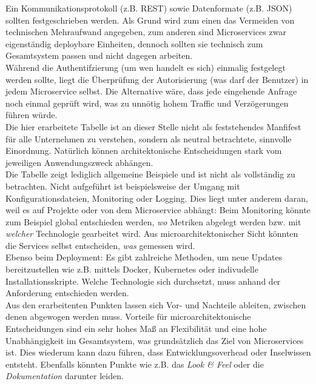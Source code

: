 Ein Kommunikationsprotokoll (z.B. REST) sowie Datenformate (z.B. JSON) sollten festgeschrieben werden.\cite{rewe2019mic_ppp} \cite{wolff2018mic_praxis} Als Grund wird zum einen das Vermeiden von technischen Mehraufwand angegeben, zum anderen sind Microservices zwar eigenständig deploybare Einheiten, dennoch sollten sie technisch zum Gesamtsystem passen und nicht dagegen arbeiten. \\

Während die Authentifzierung (um wen handelt es sich) einmalig festgelegt werden sollte, liegt die Überprüfung der Autorisierung (was darf der Benutzer) in jedem Microservice selbst. Die Alternative wäre, dass jede eingehende Anfrage noch einmal geprüft wird, was zu unnötig hohem Traffic und Verzögerungen führen würde.  \\

Die hier erarbeitete Tabelle ist an dieser Stelle nicht als feststehendes Manfifest für alle Unternehmen zu verstehen, sondern als neutral betrachtete, sinnvolle Einordnung. Natürlich können architektonische Entscheidungen stark vom jeweiligen Anwendungszweck abhängen. \\

Die Tabelle zeigt lediglich allgemeine Beispiele und ist nicht als vollständig zu betrachten. Nicht aufgeführt ist beispielsweise der Umgang mit Konfigurationsdateien, Monitoring oder Logging. Dies liegt unter anderem daran, weil es auf Projekte oder von dem Microservice abhängt: Beim Monitoring könnte zum Beispiel global entschieden werden, \textit{wo} Metriken abgelegt werden bzw. mit \textit{welcher} Technologie gearbeitet wird. Aus microarchitektonischer Sicht könnten die Services selbst entscheiden, \textit{was} gemessen wird.  \\

Ebenso beim Deployment: Es gibt zahlreiche Methoden, um neue Updates bereitzustellen wie z.B. mittels Docker, Kubernetes oder indivudelle Installationsskripte.\cite{wolff2018mic_praxis} Welche Technologie sich durchsetzt, muss anhand der Anforderung entschieden werden. \\

Aus den erarbeitenten Punkten lassen sich Vor- und Nachteile ableiten, zwischen denen abgewogen werden muss. Vorteile für microarchitektonische Entscheidungen sind ein sehr hohes Maß an Flexibilität und eine hohe Unabhängigkeit im Gesamtsystem, was grundsätzlich das Ziel von Microservices ist. Dies wiederum kann dazu führen, dass Entwicklungsoverhead oder Inselwissen entsteht. Ebenfalls könnten Punkte wie z.B. das \textit{Look \& Feel} oder die \textit{Dokumentation} darunter leiden.  \\

